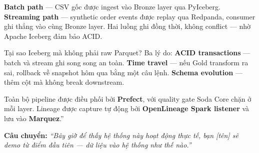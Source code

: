 \documentclass[12pt, a4paper]{article}
\newenvironment{speakerbox}[2]{%
  \begin{tcolorbox}[
    enhanced, breakable,
    colback=#1!6!white,
    colframe=#1,
    colbacktitle=#1,
    coltitle=white,
    fonttitle=\bfseries\large,
    title={#2},
    arc=4pt,
    boxrule=1.5pt,
    left=8pt, right=8pt, top=6pt, bottom=6pt,
  ]
}{%
  \end{tcolorbox}
}
\begin{document}
\begin{speakerbox}{p1color}{\faUser\ Người 1 · 0:00 -- 3:00}
\begin{scriptbox}
\textbf{Batch path} --- CSV gốc được ingest vào Bronze layer qua PyIceberg.
\textbf{Streaming path} --- synthetic order events được replay qua Redpanda, consumer ghi
thẳng vào cùng Bronze layer. Hai luồng ghi đồng thời, không conflict --- nhờ
Apache Iceberg đảm bảo ACID.

Tại sao Iceberg mà không phải raw Parquet? Ba lý do: \textbf{ACID transactions} ---
batch và stream ghi song song an toàn. \textbf{Time travel} --- nếu Gold transform ra sai,
rollback về snapshot hôm qua bằng một câu lệnh. \textbf{Schema evolution} --- thêm cột
mà không break downstream.

Toàn bộ pipeline được điều phối bởi \textbf{Prefect}, với quality gate Soda Core chặn
ở mỗi layer. Lineage được capture tự động bởi \textbf{OpenLineage Spark listener} và
lưu vào \textbf{Marquez}.''
\end{scriptbox}

\textbf{Câu chuyển:} \textit{``Bây giờ để thấy hệ thống này hoạt động thực tế, bạn [tên] sẽ
demo từ điểm đầu tiên --- dữ liệu vào hệ thống như thế nào.''}

\end{speakerbox}

\vspace{1em}
\end{document}
